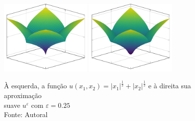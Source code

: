 \documentclass[a4paper, 11pt]{book}
\theoremstyle{definition}
\begin{document}
\begin{ex}
    \begin{figure}
        \centering
        \includegraphics[width=0.4\textwidth]{u.pdf}
        \hspace{10mm}
        \includegraphics[width=0.4\textwidth]{uε2.pdf}
        \caption{À esquerda, a função $u(x_1,x_2) = |x_1|^{\frac{1}{2}} + |x_2|^{\frac{1}{2}}$ e à direita sua aproximação\\suave $u^\varepsilon$ com $\varepsilon = 0.25$\\Fonte: Autoral}
        \label{fig:aproximacao-suave-R2}
    \end{figure}
\end{ex}
\end{document}
